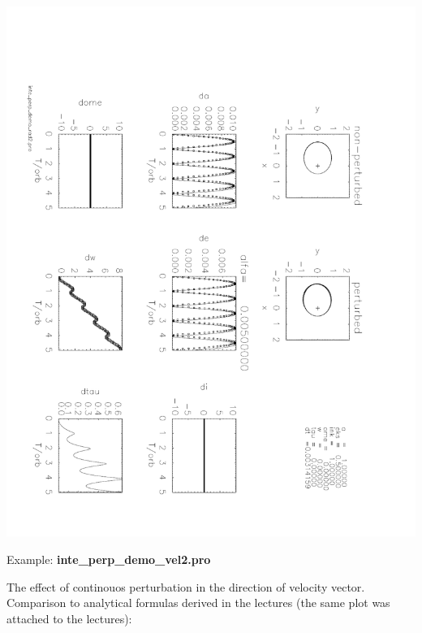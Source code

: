 \documentclass[a4paper,12pt]{article}
\def\red{\color{red}}
\def\black{\color{RGBblack}}
\begin{document}
{{\hspace{-3cm} \includegraphics[angle=90,width=0.9\paperwidth]{inte_perp_demo_rad2.pdf}



\newpage
\black

Example: {\bf inte\_perp\_demo\_vel2.pro}

\bul The effect of continouos perturbation in the direction of velocity vector. Comparison to
analytical formulas derived in the lectures (the same plot was
attached to the lectures):

{\scriptsize \red

}\black

}}
\end{document}
